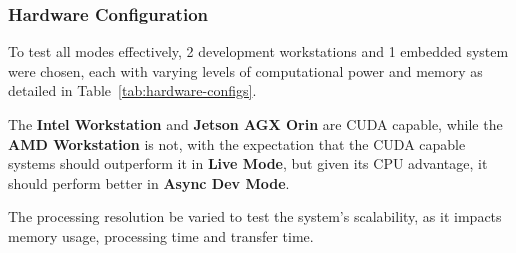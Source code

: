 \documentclass[conference]{IEEEtran}
\begin{document}
\subsubsection{Hardware Configuration}
To test all modes effectively, 2 development workstations and 1 embedded system were chosen, each with varying levels of computational power and memory as detailed in Table~\ref{tab:hardware-configs}.

\begin{table}[h!]
\centering
\caption{Hardware Configurations for System Testing}
\label{tab:hardware-configs}
\end{table}

The \textbf{Intel Workstation} and \textbf{Jetson AGX Orin} are CUDA capable, while the \textbf{AMD Workstation} is not, with the expectation that the CUDA capable systems should outperform it in \textbf{Live Mode}, but given its CPU advantage, it should perform better in \textbf{Async Dev Mode}.

The processing resolution be varied to test the system's scalability, as it impacts memory usage, processing time and transfer time.
\end{document}
